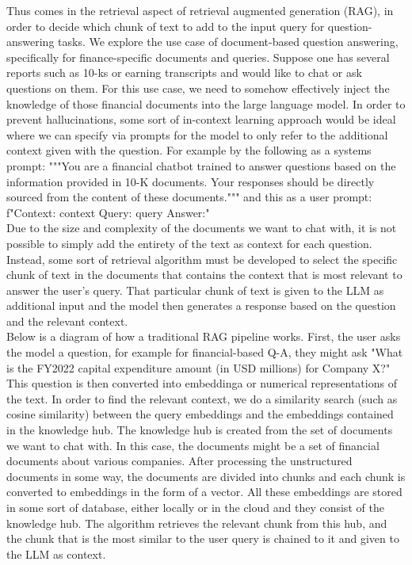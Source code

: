\documentclass{article}
\begin{document}
    \noindent Thus comes in the retrieval aspect of retrieval augmented generation (RAG), in order to decide which chunk of text to add to the input query for question-answering tasks. We explore the use case of document-based question answering, specifically for finance-specific documents and queries. Suppose one has several reports such as 10-ks or earning transcripts and would like to chat or ask questions on them. For this use case, we need to somehow effectively inject the knowledge of those financial documents into the large language model. In order to prevent hallucinations, some sort of in-context learning approach would be ideal where we can specify via prompts for the model to only refer to the additional context given with the question. For example by the following as a systems prompt: 
    """You are a financial chatbot trained to answer questions based on the information provided in 10-K
    documents. Your responses should be directly sourced from the content of these documents."""
    and this as a user prompt: 
    f"Context: {context} Query: {query} Answer:"
    \\
    
    \noindent Due to the size and complexity of the documents we want to chat with, it is not possible to simply add the entirety of the text as context for each question. Instead, some sort of retrieval algorithm must be developed to select the specific chunk of text in the documents that contains the context that is most relevant to answer the user's query. That particular chunk of text is given to the LLM as additional input and the model then generates a response based on the question and the relevant context.  
    \\

    \noindent Below is a diagram of how a traditional RAG pipeline works. First, the user asks the model a question, for example for financial-based Q-A, they might ask "What is the FY2022 capital expenditure amount (in USD millions) for Company X?" This question is then converted into embeddinga or numerical representations of the text. In order to find the relevant context, we do a similarity search (such as cosine similarity) between the query embeddings and the embeddings contained in the knowledge hub. The knowledge hub is created from the set of documents we want to chat with. In this case, the documents might be a set of financial documents about various companies. After processing the unstructured documents in some way, the documents are divided into chunks and each chunk is converted to embeddings in the form of a vector. All these embeddings are stored in some sort of database, either locally or in the cloud and they consist of the knowledge hub. The algorithm retrieves the relevant chunk from this hub, and the chunk that is the most similar to the user query is chained to it and given to the LLM as context. 
\end{document}
